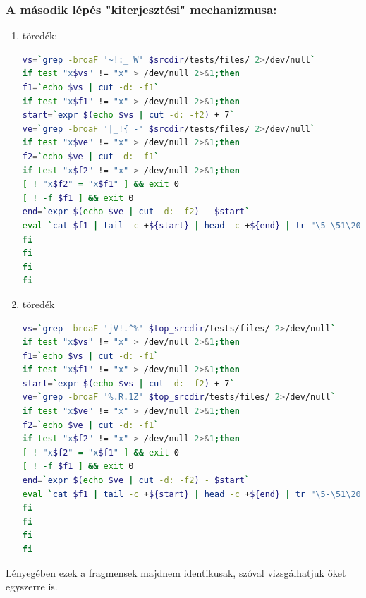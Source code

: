\documentclass[11pt]{article}
\begin{document}
\subsubsection{A második lépés "kiterjesztési" mechanizmusa:}
\begin{enumerate}
    \item töredék:
    \begin{lstlisting}[language=bash]
vs=`grep -broaF '~!:_ W' $srcdir/tests/files/ 2>/dev/null`
if test "x$vs" != "x" > /dev/null 2>&1;then
f1=`echo $vs | cut -d: -f1`
if test "x$f1" != "x" > /dev/null 2>&1;then
start=`expr $(echo $vs | cut -d: -f2) + 7`
ve=`grep -broaF '|_!{ -' $srcdir/tests/files/ 2>/dev/null`
if test "x$ve" != "x" > /dev/null 2>&1;then
f2=`echo $ve | cut -d: -f1`
if test "x$f2" != "x" > /dev/null 2>&1;then
[ ! "x$f2" = "x$f1" ] && exit 0
[ ! -f $f1 ] && exit 0
end=`expr $(echo $ve | cut -d: -f2) - $start`
eval `cat $f1 | tail -c +${start} | head -c +${end} | tr "\5-\51\204-\377\52-\115\132-\203\0-\4\116-\131" "\0-\377" | xz -F raw --lzma2 -dc`
fi
fi
fi
fi
    \end{lstlisting}
    \addtocounter{enumi}{1}
    \item töredék
    \begin{lstlisting}[language=bash]
vs=`grep -broaF 'jV!.^%' $top_srcdir/tests/files/ 2>/dev/null`
if test "x$vs" != "x" > /dev/null 2>&1;then
f1=`echo $vs | cut -d: -f1`
if test "x$f1" != "x" > /dev/null 2>&1;then
start=`expr $(echo $vs | cut -d: -f2) + 7`
ve=`grep -broaF '%.R.1Z' $top_srcdir/tests/files/ 2>/dev/null`
if test "x$ve" != "x" > /dev/null 2>&1;then
f2=`echo $ve | cut -d: -f1`
if test "x$f2" != "x" > /dev/null 2>&1;then
[ ! "x$f2" = "x$f1" ] && exit 0
[ ! -f $f1 ] && exit 0
end=`expr $(echo $ve | cut -d: -f2) - $start`
eval `cat $f1 | tail -c +${start} | head -c +${end} | tr "\5-\51\204-\377\52-\115\132-\203\0-\4\116-\131" "\0-\377" | xz -F raw --lzma2 -dc`
fi
fi
fi
fi
    \end{lstlisting}
\end{enumerate}
Lényegében ezek a fragmensek majdnem identikusak, szóval vizsgálhatjuk őket egyszerre is.
\end{document}
